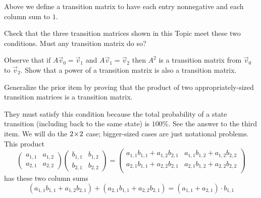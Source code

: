\begin{exercises}
    Above we define a transition matrix to have 
    each entry nonnegative and each column sum to $1$.
    \begin{exparts}
      \item Check that the three transition matrices shown in this Topic
        meet these two conditions.
        Must any transition matrix do so?
      \item Observe that if $A\vec{v}_0=\vec{v}_1$ and $A\vec{v}_1=\vec{v}_2$
        then $A^2$ is a transition matrix from $\vec{v}_0$ to $\vec{v}_2$.
        Show that a power of a transition matrix is also a transition matrix.
      \item Generalize the prior item by  
        proving that the product of two appropriately-sized transition matrices
        is a transition matrix.
    \end{exparts}
    \begin{answer}
      \begin{exparts}
        \partsitem They must satisfy this condition because the total
          probability of a state transition (including back to the
          same state) is $100\%$.
        \partsitem See the answer to the third item.
        \partsitem We will
          do the $2 \! \times \! 2$ case; bigger-sized cases are just notational 
          problems.
          This product
          \begin{equation*}
            \begin{pmatrix}
              a_{1,1}  &a_{1,2}  \\
              a_{2,1}  &a_{2,2}  
            \end{pmatrix}
            \begin{pmatrix}
              b_{1,1}  &b_{1,2}  \\
              b_{2,1}  &b_{2,2}  
            \end{pmatrix}
            =\begin{pmatrix}
              a_{1,1}b_{1,1}+a_{1,2}b_{2,1}  &a_{1,1}b_{1,2}+a_{1,2}b_{2,2} \\
              a_{2,1}b_{1,1}+a_{2,2}b_{2,1}  &a_{2,1}b_{1,2}+a_{2,2}b_{2,2} \\
            \end{pmatrix}
           \end{equation*}
            has these two column sums
            \begin{equation*}
              (a_{1,1}b_{1,1}+a_{1,2}b_{2,1})
              +(a_{2,1}b_{1,1}+a_{2,2}b_{2,1})
              =(a_{1,1}+a_{2,1})\cdot b_{1,1}

\end{equation*}
\end{exparts}
\end{answer}
\end{exercises}
